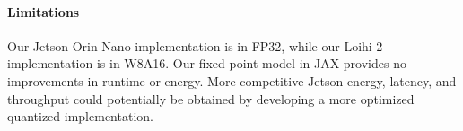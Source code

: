 \paragraph{Limitations}

Our Jetson Orin Nano implementation is in FP32, while our Loihi 2 implementation is in W8A16. Our fixed-point model in JAX provides no improvements in runtime or energy. More competitive Jetson energy, latency, and throughput could potentially be obtained by developing a more optimized quantized implementation. 



